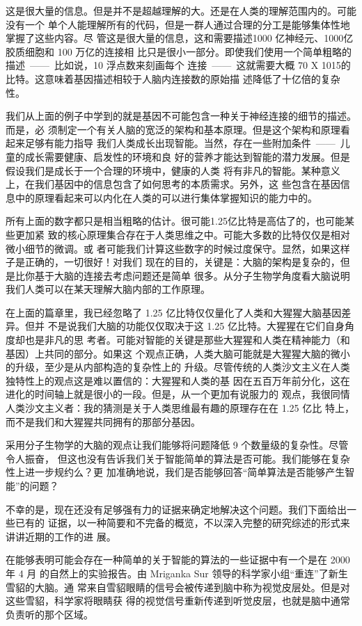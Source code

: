 这是很大量的信息。但是并不是超越理解的大。还是在人类的理解范围内的。可能没有一个
单个人能理解所有的代码，但是一群人通过合理的分工是能够集体性地掌握了这些内容。尽
管这是很大量的信息，这和需要描述1000 亿神经元、1000亿胶质细胞和 100 万亿的连接相
比只是很小一部分。即使我们使用一个简单粗略的描述~——~比如说，10 浮点数来刻画每个
连接~——~这就需要大概 70 X 1015的比特。这意味着基因描述相较于人脑内连接数的原始描
述降低了十亿倍的复杂性。

我们从上面的例子中学到的就是基因不可能包含一种关于神经连接的细节的描述。而是，必
须制定一个有关人脑的宽泛的架构和基本原理。但是这个架构和原理看起来足够有能力指导
我们人类成长出现智能。当然，存在一些附加条件~——~儿童的成长需要健康、启发性的环境和良
好的营养才能达到智能的潜力发展。但是假设我们是成长于一个合理的环境中，健康的人类
将有非凡的智能。某种意义上，在我们基因中的信息包含了如何思考的本质需求。另外，这
些包含在基因信息中的原理看起来可以内化在人类的可以进行集体掌握知识的能力中的。

所有上面的数字都只是相当粗略的估计。很可能1.25亿比特是高估了的，也可能某些更加紧
致的核心原理集合存在于人类思维之中。可能大多数的比特仅仅是相对微小细节的微调。或
者可能我们计算这些数字的时候过度保守。显然，如果这样子是正确的，一切很好！对我们
现在的目的，关键是：大脑的架构是复杂的，但是比你基于大脑的连接去考虑问题还是简单
很多。从分子生物学角度看大脑说明我们人类可以在某天理解大脑内部的工作原理。

在上面的篇章里，我已经忽略了 1.25 亿比特仅仅量化了人类和大猩猩大脑基因差异。但并
不是说我们大脑的功能仅仅取决于这 1.25 亿比特。大猩猩在它们自身角度却也是非凡的思
考者。可能对智能的关键是那些大猩猩和人类在精神能力（和基因）上共同的部分。如果这
个观点正确，人类大脑可能就是大猩猩大脑的微小的升级，至少是从内部构造的复杂性上的
升级。尽管传统的人类沙文主义在人类独特性上的观点这是难以置信的：大猩猩和人类的基
因在五百万年前分化，这在进化的时间轴上就是很小的一段。但是，从一个更加有说服力的
观点，我很同情人类沙文主义者：我的猜测是关于人类思维最有趣的原理存在在 1.25 亿比
特上，而不是我们和大猩猩共同拥有的那部分基因。

采用分子生物学的大脑的观点让我们能够将问题降低 9 个数量级的复杂性。尽管令人振奋，
但这也没有告诉我们关于智能简单的算法是否可能。我们能够在复杂性上进一步规约么？更
加准确地说，我们是否能够回答“简单算法是否能够产生智能”的问题？

不幸的是，现在还没有足够强有力的证据来确定地解决这个问题。我们下面给出一些已有的
证据，以一种简要和不完备的概览，不以深入完整的研究综述的形式来讲讲近期的工作的进
展。

在能够表明可能会存在一种简单的关于智能的算法的一些证据中有一个是在 2000 年 4 月
的自然上的实验报告。由 Mriganka Sur 领导的科学家小组“重连”了新生雪貂的大脑。通
常来自雪貂眼睛的信号会被传递到脑中称为视觉皮层处。但是对这些雪貂，科学家将眼睛获
得的视觉信号重新传递到听觉皮层，也就是脑中通常负责听的那个区域。

